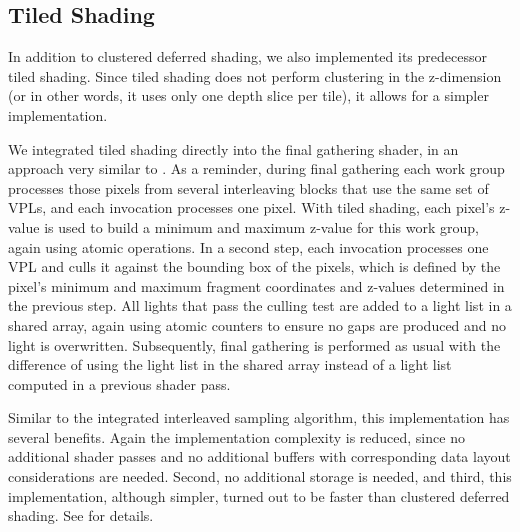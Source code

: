 \subsection{Tiled Shading}

In addition to clustered deferred shading, we also implemented its predecessor tiled shading. Since tiled shading does not perform clustering in the z-dimension (or in other words, it uses only one depth slice per tile), it allows for a simpler implementation.

We integrated tiled shading directly into the final gathering shader, in an approach very similar to \citet{Andersson:2011:RenderingBattlefield3}. As a reminder, during final gathering each work group processes those pixels from several interleaving blocks that use the same set of VPLs, and each invocation processes one pixel. With tiled shading, each pixel's z-value is used to build a minimum and maximum z-value for this work group, again using atomic operations. In a second step, each invocation processes one VPL and culls it against the bounding box of the pixels, which is defined by the pixel's minimum and maximum fragment coordinates and z-values determined in the previous step. All lights that pass the culling test are added to a light list in a shared array, again using atomic counters to ensure no gaps are produced and no light is overwritten. Subsequently, final gathering is performed as usual with the difference of using the light list in the shared array instead of a light list computed in a previous shader pass.

Similar to the integrated interleaved sampling algorithm, this implementation has several benefits. Again the implementation complexity is reduced, since no additional shader passes and no additional buffers with corresponding data layout considerations are needed. Second, no additional storage is needed, and third, this implementation, although simpler, turned out to be faster than clustered deferred shading. See  for details.
